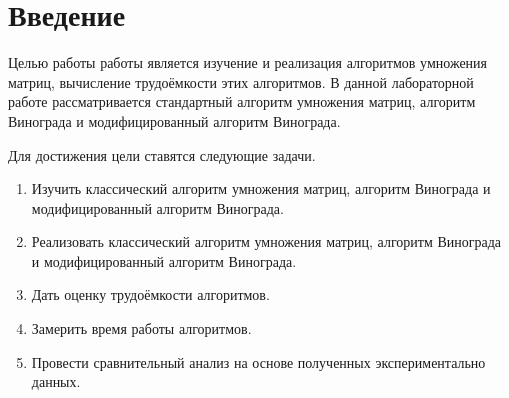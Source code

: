 \chapter*{Введение}

Целью работы работы является изучение и реализация алгоритмов
умножения матриц, вычисление трудоёмкости этих алгоритмов. В данной
лабораторной работе рассматривается стандартный алгоритм умножения
матриц, алгоритм Винограда и модифицированный алгоритм Винограда.


Для достижения цели ставятся следующие задачи.


\begin{enumerate}
	\item Изучить классический алгоритм умножения матриц, алгоритм Винограда и модифицированный алгоритм Винограда.
	\item Реализовать классический алгоритм умножения матриц, алгоритм
	Винограда и модифицированный алгоритм Винограда.

	\item Дать оценку трудоёмкости алгоритмов.
	\item Замерить время работы алгоритмов.
	\item Провести сравнительный анализ на основе полученных экспериментально данных.
\end{enumerate}
